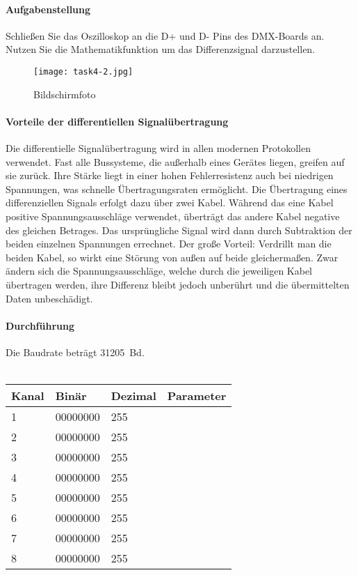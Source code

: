 \paragraph{Aufgabenstellung}
Schließen Sie das Oszilloskop an die D+ und D- Pins des DMX-Boards an. Nutzen Sie die Mathematikfunktion um das Differenzsignal darzustellen.

\begin{figure}
	\centering
	\texttt{[image: task4-2.jpg]}
	\caption{Bildschirmfoto}
	\label{task4-2}
\end{figure}

\paragraph{Vorteile der differentiellen Signalübertragung}
Die differentielle Signalübertragung wird in allen modernen Protokollen verwendet. Fast alle Bussysteme, die außerhalb eines Gerätes liegen, greifen auf sie zurück. Ihre Stärke liegt in einer hohen Fehlerresistenz auch bei niedrigen Spannungen, was schnelle Übertragungsraten ermöglicht. Die Übertragung eines differenziellen Signals erfolgt dazu über zwei Kabel. Während das eine Kabel positive Spannungsausschläge verwendet, überträgt das andere Kabel negative des gleichen Betrages. Das ursprüngliche Signal wird dann durch Subtraktion der beiden einzelnen Spannungen errechnet. Der große Vorteil: Verdrillt man die beiden Kabel, so wirkt eine Störung von außen auf beide gleichermaßen. Zwar ändern sich die Spannungsausschläge, welche durch die jeweiligen Kabel übertragen werden, ihre Differenz bleibt jedoch unberührt und die übermittelten Daten unbeschädigt.

\paragraph{Durchführung}
Die Baudrate beträgt \SI{31205}{Bd}.
\\\\
\begin{tabular}{|l|l|l|l|}
	\hline
	Kanal & Binär    & Dezimal & Parameter \\ \hline\hline
	1     & 00000000 & 255     &           \\ \hline
	2     & 00000000 & 255     &           \\ \hline
	3     & 00000000 & 255     &           \\ \hline
	4     & 00000000 & 255     &           \\ \hline
	5     & 00000000 & 255     &           \\ \hline
	6     & 00000000 & 255     &           \\ \hline
	7     & 00000000 & 255     &           \\ \hline
	8     & 00000000 & 255     &           \\ \hline
\end{tabular}


